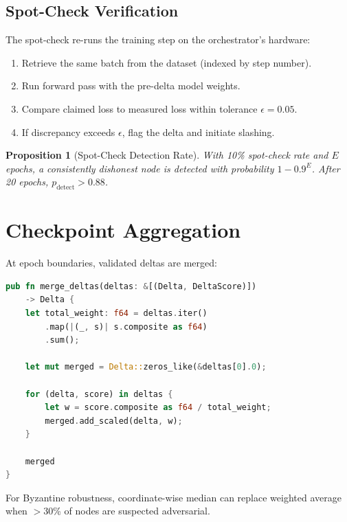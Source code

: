 \documentclass[11pt,letterpaper]{article}
\newtheorem{proposition}[theorem]{Proposition}
\begin{document}
\subsection{Spot-Check Verification}

The spot-check re-runs the training step on the orchestrator's hardware:

\begin{enumerate}
    \item Retrieve the same batch from the dataset (indexed by step number).
    \item Run forward pass with the pre-delta model weights.
    \item Compare claimed loss to measured loss within tolerance $\epsilon = 0.05$.
    \item If discrepancy exceeds $\epsilon$, flag the delta and initiate slashing.
\end{enumerate}

\begin{proposition}[Spot-Check Detection Rate]
With 10\% spot-check rate and $E$ epochs, a consistently dishonest node is detected with probability $1 - 0.9^E$.  After 20 epochs, $p_{\text{detect}} > 0.88$.
\end{proposition}

\section{Checkpoint Aggregation}

At epoch boundaries, validated deltas are merged:

\begin{lstlisting}[language=Rust,caption=Weighted checkpoint merge]
pub fn merge_deltas(deltas: &[(Delta, DeltaScore)])
    -> Delta {
    let total_weight: f64 = deltas.iter()
        .map(|(_, s)| s.composite as f64)
        .sum();

    let mut merged = Delta::zeros_like(&deltas[0].0);

    for (delta, score) in deltas {
        let w = score.composite as f64 / total_weight;
        merged.add_scaled(delta, w);
    }

    merged
}
\end{lstlisting}

For Byzantine robustness, coordinate-wise median can replace weighted average when $>$30\% of nodes are suspected adversarial.

\end{document}
